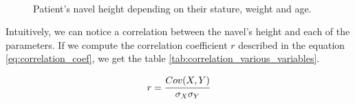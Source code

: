 \documentclass{article}
\begin{document}
\begin{figure}[H]
    \centering
     \\
    \caption{Patient's navel height depending on their stature, weight and age.}
    \label{fig:estimation_navel_various_parameters}
\end{figure}

Intuitively, we can notice a correlation between the navel's height and each of the parameters. If we compute the correlation coefficient $r$ described in the equation \ref{eq:correlation_coef}, we get the table \ref{tab:correlation_various_variables}.

\begin{equation}
\label{eq:correlation_coef}
    r = \cfrac{Cov(X,Y)}{\sigma_X \sigma_Y}
\end{equation}
\end{document}

